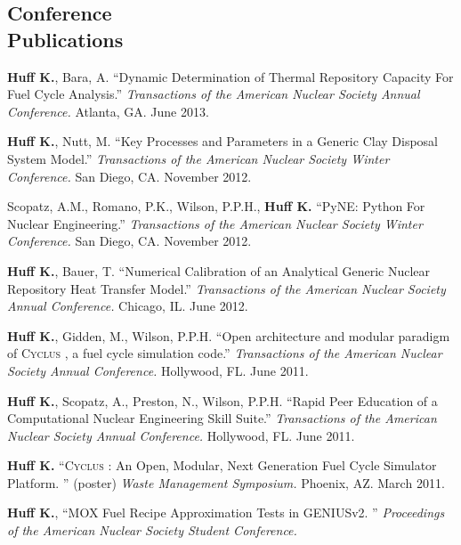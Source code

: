 \documentclass[margin,line]{resume}
\newcommand{\Cyclus}{\textsc{Cyclus }}
\begin{document}
\begin{resume}
    \section{\mysidestyle Conference\\Publications}
    \begin{bibenum}
      \item \textbf{Huff K.}, Bara, A. ``Dynamic Determination of Thermal Repository Capacity For Fuel Cycle Analysis.''
         \emph{Transactions of the American Nuclear Society Annual Conference.} 
         Atlanta, GA. June 2013.
      \item \textbf{Huff K.}, Nutt, M. ``Key Processes and Parameters in a Generic Clay Disposal System Model.''
         \emph{Transactions of the American Nuclear Society Winter Conference.} 
        San Diego, CA. November 2012.
      \item Scopatz, A.M., Romano, P.K., Wilson, P.P.H., \textbf{Huff K.} ``PyNE: Python For Nuclear Engineering.''
         \emph{Transactions of the American Nuclear Society Winter Conference.} 
        San Diego, CA. November 2012. 
      \item \textbf{Huff K.}, Bauer, T. ``Numerical Calibration of an Analytical Generic Nuclear Repository Heat Transfer Model.''
         \emph{Transactions of the American Nuclear Society Annual Conference.} 
        Chicago, IL. June 2012.
      \item \textbf{Huff K.}, Gidden, M., Wilson, P.P.H. ``Open architecture and modular paradigm of \Cyclus, a fuel cycle simulation code.''
         \emph{Transactions of the American Nuclear Society Annual Conference.} 
        Hollywood, FL. June 2011.
      \item \textbf{Huff K.}, Scopatz, A., Preston, N., Wilson, P.P.H. ``Rapid Peer Education of a Computational Nuclear Engineering Skill Suite.'' 
         \emph{Transactions of the American Nuclear Society Annual Conference.} 
        Hollywood, FL. June 2011.
      \item \textbf{Huff K.} ``\Cyclus: An Open, Modular, Next Generation Fuel Cycle Simulator Platform. ''
        (poster)  \emph{Waste Management Symposium.} Phoenix, AZ. March 
        2011.
      \item \textbf{Huff K.}, ``MOX Fuel Recipe Approximation Tests in GENIUSv2. ''
         \emph{Proceedings of the American Nuclear Society Student Conference.} 

\end{bibenum}
\end{resume}
\end{document}

